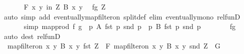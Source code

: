 \begin{isabellebody}
\ \ \ \ \isamarkupfalse%
\ {\isachardoublequoteopen}{\isasymforall}\isactrlsub F\ {\isacharparenleft}{\kern0pt}x{\isacharcomma}{\kern0pt}\ y{\isacharparenright}{\kern0pt}\ in\ {\isacharquery}{\kern0pt}Z{\isachardot}{\kern0pt}\ B\ x\ y{\isachardoublequoteclose}\ \isamarkupfalse%
\ fg\ Z\isanewline
\ \ \ \ \ \ \isamarkupfalse%
{\isacharparenleft}{\kern0pt}auto\ simp\ add{\isacharcolon}{\kern0pt}\ eventually{\isacharunderscore}{\kern0pt}map{\isacharunderscore}{\kern0pt}filter{\isacharunderscore}{\kern0pt}on\ split{\isacharunderscore}{\kern0pt}def\ elim{\isacharbang}{\kern0pt}{\isacharcolon}{\kern0pt}\ eventually{\isacharunderscore}{\kern0pt}mono\ rel{\isacharunderscore}{\kern0pt}funD{\isacharparenright}{\kern0pt}\isanewline
\ \ \ \ \isamarkupfalse%
\ {\isacharbrackleft}{\kern0pt}simp{\isacharbrackright}{\kern0pt}{\isacharcolon}{\kern0pt}\ {\isachardoublequoteopen}map{\isacharunderscore}{\kern0pt}prod\ f\ g\ {\isacharbackquote}{\kern0pt}\ {\isacharbraceleft}{\kern0pt}p{\isachardot}{\kern0pt}\ A\ {\isacharparenleft}{\kern0pt}fst\ p{\isacharparenright}{\kern0pt}\ {\isacharparenleft}{\kern0pt}snd\ p{\isacharparenright}{\kern0pt}{\isacharbraceright}{\kern0pt}\ {\isasymsubseteq}\ {\isacharbraceleft}{\kern0pt}p{\isachardot}{\kern0pt}\ B\ {\isacharparenleft}{\kern0pt}fst\ p{\isacharparenright}{\kern0pt}\ {\isacharparenleft}{\kern0pt}snd\ p{\isacharparenright}{\kern0pt}{\isacharbraceright}{\kern0pt}{\isachardoublequoteclose}\isanewline
\ \ \ \ \ \ \isamarkupfalse%
\ fg\ \isamarkupfalse%
{\isacharparenleft}{\kern0pt}auto\ dest{\isacharcolon}{\kern0pt}\ rel{\isacharunderscore}{\kern0pt}funD{\isacharparenright}{\kern0pt}\isanewline
\ \ \ \ \isamarkupfalse%
\ {\isachardoublequoteopen}map{\isacharunderscore}{\kern0pt}filter{\isacharunderscore}{\kern0pt}on\ {\isacharbraceleft}{\kern0pt}{\isacharparenleft}{\kern0pt}x{\isacharcomma}{\kern0pt}\ y{\isacharparenright}{\kern0pt}{\isachardot}{\kern0pt}\ B\ x\ y{\isacharbraceright}{\kern0pt}\ fst\ {\isacharquery}{\kern0pt}Z\ {\isacharequal}{\kern0pt}\ {\isacharquery}{\kern0pt}F{\isachardoublequoteclose}\ {\isachardoublequoteopen}map{\isacharunderscore}{\kern0pt}filter{\isacharunderscore}{\kern0pt}on\ {\isacharbraceleft}{\kern0pt}{\isacharparenleft}{\kern0pt}x{\isacharcomma}{\kern0pt}\ y{\isacharparenright}{\kern0pt}{\isachardot}{\kern0pt}\ B\ x\ y{\isacharbraceright}{\kern0pt}\ snd\ {\isacharquery}{\kern0pt}Z\ {\isacharequal}{\kern0pt}\ {\isacharquery}{\kern0pt}G{\isachardoublequoteclose}\isanewline
\ \ \ \ \ \ \isamarkupfalse%

\end{isabellebody}

